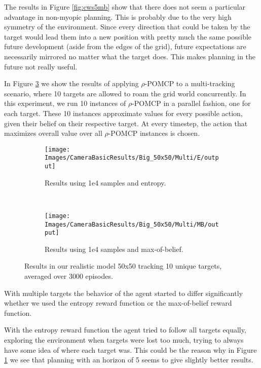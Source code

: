 The results in Figure \ref{fig:cws5mb} show that there does not seem a particular advantage in
non-myopic planning. This is probably due to the very high symmetry of the environment. Since every
direction that could be taken by the target would lead them into a new position with pretty much the
same possible future development (aside from the edges of the grid), future expectations are
necessarily mirrored no matter what the target does. This makes planning in the future not really
useful. 

In Figure \ref{fig:cwb10} we show the results of applying $\rho$-POMCP to a multi-tracking scenario, where
10 targets are allowed to roam the grid world concurrently. In this experiment, we run 10 instances
of $\rho$-POMCP in a parallel fashion, one for each target. These 10 instances approximate values for
every possible action, given their belief on their respective target. At every timestep, the action that
maximizes overall value over all $\rho$-POMCP instances is chosen.

\begin{figure}[ht!]
        \centering
        \begin{subfigure}[t]{0.5\textwidth}
                \texttt{[image: Images/CameraBasicResults/Big\_50x50/Multi/E/output]}
                \caption{Results using 1e4 samples and entropy.}
                \label{fig:cwb4e10}
        \end{subfigure}%
        ~ %
        \begin{subfigure}[t]{0.5\textwidth}
                \texttt{[image: Images/CameraBasicResults/Big\_50x50/Multi/MB/output]}
                \caption{Results using 1e4 samples and max-of-belief.}
                \label{fig:cwb5mb10}
        \end{subfigure}
        \caption{Results in our realistic model 50x50 tracking 10 unique targets, averaged over 3000 episodes.}
        \label{fig:cwb10}
\end{figure}

With multiple targets the behavior of the agent started to differ significantly whether we used the
entropy reward function or the max-of-belief reward function.

With the entropy reward function the agent tried to follow all targets equally, exploring the
environment when targets were lost too much, trying to always have some idea of where each target
was. This could be the reason why in Figure \ref{fig:cwb4e10} we see that planning with an horizon
of 5 seems to give slightly better results.

